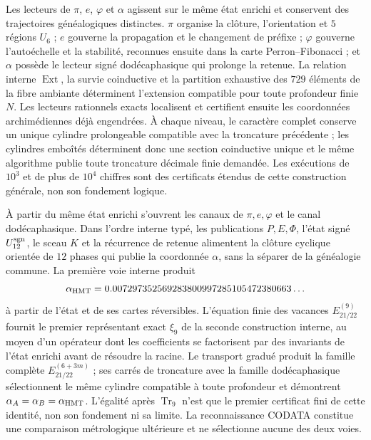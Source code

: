 Les lecteurs de \(\pi\), \(e\), \(\varphi\) et \(\alpha\) agissent sur le même
état enrichi et conservent des trajectoires généalogiques distinctes.
\(\pi\) organise la clôture, l'orientation et \(5\) régions \(U_6\) ; \(e\)
gouverne la propagation et le changement de préfixe ; \(\varphi\) gouverne l'autoéchelle et la
stabilité, reconnues ensuite dans la carte Perron--Fibonacci ; et \(\alpha\)
possède le lecteur signé dodécaphasique qui prolonge la retenue. La relation
interne \(\operatorname{Ext}\), la survie coinductive et la partition
exhaustive des \(729\) éléments de la fibre ambiante déterminent
l'extension compatible pour toute profondeur finie \(N\). Les lecteurs
rationnels exacts localisent et certifient ensuite les coordonnées
archimédiennes déjà engendrées. À chaque niveau, le caractère complet conserve un
unique cylindre prolongeable compatible avec la troncature précédente ; les
cylindres emboîtés déterminent donc une section
coinductive unique et le même algorithme publie toute troncature décimale
finie demandée. Les exécutions de \(10^3\) et de plus de \(10^4\) chiffres sont
des certificats étendus de cette construction générale, non son fondement logique.

À partir du même état enrichi s'ouvrent les canaux de
\(\pi,e,\varphi\) et le canal dodécaphasique. Dans l'ordre interne typé, les
publications \(P,E,\Phi\), l'état signé \(U_{12}^{\rm sgn}\), le sceau
\(K\) et la récurrence de retenue alimentent la clôture cyclique orientée de
\(12\) phases qui publie la coordonnée \(\alpha\), sans la séparer de la
généalogie commune. La première voie interne produit
\[
 \alpha_{\rm HMT}
 =0.007297352569283800997285105472380663\ldots
\]
à partir de l'état et de ses cartes réversibles. L'équation finie des vacances
\(E_{21/22}^{(9)}\) fournit le premier représentant exact \(\xi_9\) de
la seconde construction interne, au moyen d'un opérateur dont les coefficients
se factorisent par des invariants de l'état enrichi avant de résoudre la racine.
Le transport gradué produit la famille complète
\(E_{21/22}^{(6+3m)}\) ; ses carrés de troncature avec la famille
dodécaphasique sélectionnent le même cylindre compatible à toute profondeur et
démontrent \(\alpha_A=\alpha_B=\alpha_{\rm HMT}\). L'égalité après
\(\operatorname{Tr}_9\) n'est que le premier certificat fini de cette identité,
non son fondement ni sa limite. La reconnaissance CODATA constitue une
comparaison métrologique ultérieure et ne sélectionne aucune des deux voies.

